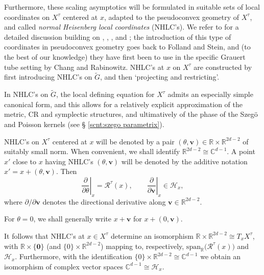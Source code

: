 \documentclass[12pt,a4paper]{article}
\theoremstyle{plain}
\theoremstyle{definition}
\begin{document}
Furthermore, these scaling asymptotics will be formulated in suitable
sets of local coordinates on $X^\tau$ centered at $x$, 
adapted to the pseudoconvex geometry of $X^\tau$,
and called
\textit{normal Heisenberg local coordinates} (NHLC's).
We refer to \cite{p24} for a detailed discussion building on 
\cite{cr1}, \cite{cr2}, \cite{sz}, \cite{fs1} and \cite{fs2}; the introduction of this type
of coordinates in pseudoconvex geometry goes back to Folland and Stein, and (to the best of our knowledge) they have first been to use in the specific
Grauert tube setting by Chang and Rabinowitz.
NHLC's at $x$ on $X^\tau$ are constructed by first introducing 
NHLC's on $\tilde{G}$, and then \lq projecting and restricting\rq. 

In NHLC's on $\tilde{G}$, the local defining equation for $X^\tau$ admits an especially 
simple canonical form,
and this allows for a relatively explicit approximation of the
metric, CR and symplectic structures, and ultimatively of
the phase of the Szeg\"{o} and Poisson kernels (see \S 
\ref{scnt:szego parametrix}).

NHLC's on $X^\tau$ centered at $x$ will be denoted by
a pair $(\theta,\mathbf{v})\in \mathbb{R}\times \mathbb{R}^{2d-2}$
of suitably small norm. 
When convenient, we shall identify
$\mathbb{R}^{2d-2}\cong \mathbb{C}^{d-1}$. 
A point $x'$ close to
$x$ having NHLC's $(\theta,\mathbf{v})$ will be denoted 
by the additive
notation $x'=x+(\theta,\mathbf{v})$.
%
Then
\begin{equation}
\label{eqn:contact theta}
\left.\frac{\partial}{\partial \theta}\right|_x=
\mathcal{R}^\tau(x),\qquad
\left.\frac{\partial}{\partial \mathbf{v}}\right|_x\in \mathcal{H}_x,
\end{equation}
where $\partial/\partial \mathbf{v}$ denotes the directional
derivative along $\mathbf{v}\in \mathbb{R}^{2d-2}$.

For $\theta=0$, we shall generally write
$x+\mathbf{v}$ for $x+(0,\mathbf{v})$.

It follows that NHLC's at $x\in X^\tau$ determine an isomorphism
$\mathbb{R}\times \mathbb{R}^{2d-2}\cong T_xX^\tau$, with
$\mathbb{R}\times \{\mathbf{0}\}$ (and 
$\{0\}\times \mathbb{R}^{2d-2}$) mapping to, respectively, 
$\mathrm{span}_{\mathbb{R}}\big(\mathcal{R}^\tau(x)\big)$
and $\mathcal{H}_x$.
Furthermore, with the identification
$\{0\}\times \mathbb{R}^{2d-2}\cong \mathbb{C}^{d-1}$
we obtain an isomorphism of complex vector spaces
$\mathbb{C}^{d-1}\cong \mathcal{H}_x$.
\end{document}
